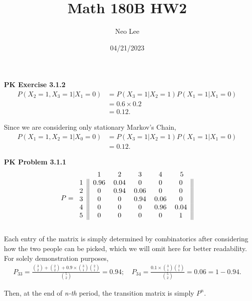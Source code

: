 \documentclass{article}
\title{Math 180B HW2}
\author{Neo Lee}
\date{04/21/2023}
\begin{document}
 

\maketitle 
\textbf{PK Exercise 3.1.2}
\begin{align}
    P(X_2 = 1, X_3 = 1|X_1 = 0) &= P(X_3=1|X_2=1)P(X_1=1|X_1=0) \nonumber \\
    & = 0.6 \times 0.2 \nonumber \\
    & = 0.12. \nonumber 
\end{align}

Since we are considering only stationary Markov's Chain,
\begin{align}
    P(X_1 = 1, X_2 = 1|X_0 = 0) &= P(X_3=1|X_2=1)P(X_1=1|X_1=0) \nonumber \\
    &= 0.12. \nonumber
\end{align}
\bigbreak


\textbf{PK Problem 3.1.1}
\begin{align}
    P = 
    \begin{blockarray}{cccccc}
        & 1 & 2 & 3 & 4 & 5 \\
        \begin{block}{c||ccccc||}
          1 & 0.96 & 0.04 & 0 & 0 & 0 \\
          2 & 0 & 0.94 & 0.06 & 0 & 0 \\
          3 & 0 & 0 & 0.94 & 0.06 & 0 \\
          4 & 0 & 0 & 0 & 0.96 & 0.04 \\
          5 & 0 & 0 & 0 & 0 & 1 \\
        \end{block}
    \end{blockarray} \nonumber
\end{align}

Each entry of the matrix is simply determined by combinatorics after considering how the two people can be picked, which we will omit here for better readability.
For solely demonstration purposes, 
\begin{align}    
    P_{33} = \frac{{3\choose 2} + {2\choose 2} + 0.9\times {3\choose 1}{2\choose 1}}{{5\choose 2}} = 0.94; \quad P_{34} = \frac{0.1\times{3\choose 1}{2\choose 1}}{{5\choose 2}} = 0.06 = 1-0.94. \nonumber
\end{align}

Then, at the end of \emph{n-th} period, the transition matrix is simply $P^n$.
\bigbreak
\end{document}
